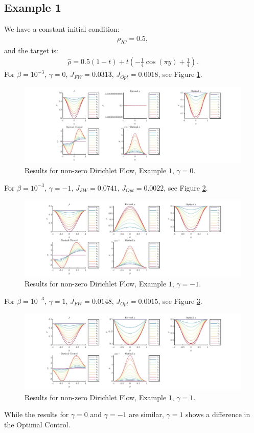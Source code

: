 \documentclass[11pt, a4paper]{article}
\theoremstyle{definition}
\begin{document}
\subsection{Example 1}
We have a constant initial condition:
\begin{align*}
\rho_{IC} = 0.5,
\end{align*}
and the target is:
\begin{align*}
\hat \rho = 0.5(1-t) + t(-\frac{1}{4}\cos(\pi y) + \frac{1}{4}).
\end{align*}
For $\beta = 10^{-3}$, $\gamma = 0$, $J_{FW} = 0.0313$, $J_{Opt} = 0.0018$, see Figure \ref{Res1D05}.
\begin{figure}[h]
	\includegraphics[scale=0.3]{ResD051.jpg}
	\caption{Results for non-zero Dirichlet Flow, Example $1$, $\gamma = 0$.}
	\label{Res1D05}
\end{figure}
For $\beta = 10^{-3}$, $\gamma = -1$, $J_{FW} = 0.0741$, $J_{Opt} = 0.0022$, see Figure \ref{Res1aD05}.
\begin{figure}[h]
	\includegraphics[scale=0.3]{ResD051a.jpg}
	\caption{Results for non-zero Dirichlet Flow, Example $1$, $\gamma = -1$.}
	\label{Res1aD05}
\end{figure}
For $\beta = 10^{-3}$, $\gamma = 1$, $J_{FW} = 0.0148$, $J_{Opt} = 0.0015$, see Figure \ref{Res1bD05}.
\begin{figure}[h]
	\includegraphics[scale=0.3]{ResD051b.jpg}
	\caption{Results for non-zero Dirichlet Flow, Example $1$, $\gamma = 1$.}
	\label{Res1bD05}
\end{figure}
While the results for $\gamma =0$ and $\gamma = -1$ are similar, $\gamma = 1$ shows a difference in the Optimal Control.
\end{document}
